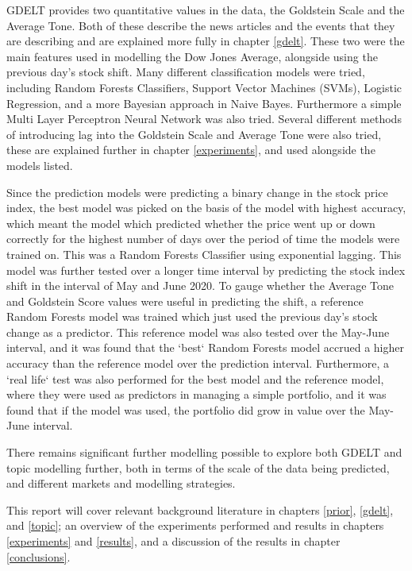 GDELT provides two quantitative values in the data, the Goldstein Scale and the Average Tone. Both of these describe the news articles and the events that they are describing and are explained more fully in chapter \ref{gdelt}. These two were the main features used in modelling the Dow Jones Average, alongside using the previous day's stock shift. Many different classification models were tried, including Random Forests Classifiers, Support Vector Machines (SVMs), Logistic Regression, and a more Bayesian approach in Naive Bayes. Furthermore a simple Multi Layer Perceptron Neural Network was also tried. Several different methods of introducing lag into the Goldstein Scale and Average Tone were also tried, these are explained further in chapter \ref{experiments}, and used alongside the models listed. 

Since the prediction models were predicting a binary change in the stock price index, the best model was picked on the basis of the model with highest accuracy, which meant the model which predicted whether the price went up or down correctly for the highest number of days over the period of time the models were trained on. This was a Random Forests Classifier using exponential lagging. This model was further tested over a longer time interval by predicting the stock index shift in the interval of May and June 2020. To gauge whether the Average Tone and Goldstein Score values were useful in predicting the shift, a reference Random Forests model was trained which just used the previous day's stock change as a predictor. This reference model was also tested over the May-June interval, and it was found that the `best` Random Forests model accrued a higher accuracy than the reference model over the prediction interval. Furthermore, a `real life` test was also performed for the best model and the reference model, where they were used as predictors in managing a simple portfolio, and it was found that if the model was used, the portfolio did grow in value over the May-June interval.  

There remains significant further modelling possible to explore both GDELT and topic modelling further, both in terms of the scale of the data being predicted, and different markets and modelling strategies. 

This report will cover relevant background literature in chapters \ref{prior}, \ref{gdelt}, and \ref{topic};  an overview of the experiments performed and results in chapters \ref{experiments} and \ref{results}, and a discussion of the results in chapter \ref{conclusions}.